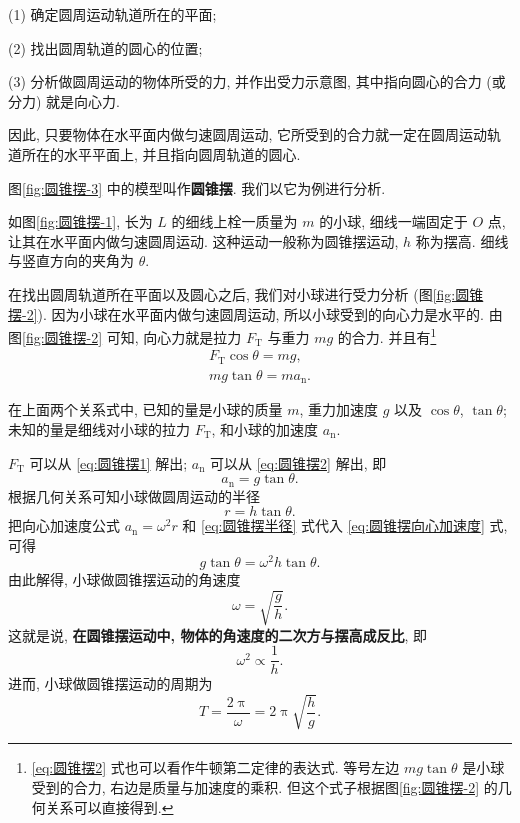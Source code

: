 \documentclass[UTF8,openany,fontset=fandol]{ctexbook}
\theoremstyle{chinesetextbook}
\begin{document}
(1) 确定圆周运动轨道所在的平面;

(2) 找出圆周轨道的圆心的位置;

(3) 分析做圆周运动的物体所受的力, 并作出受力示意图, 其中指向圆心的合力 (或分力) 就是向心力.

因此, 只要物体在水平面内做匀速圆周运动, 它所受到的合力就一定在圆周运动轨道所在的水平平面上, 并且指向圆周轨道的圆心.

图\ref{fig:圆锥摆-3} 中的模型叫作\textbf{圆锥摆}. 我们以它为例进行分析.

如图\ref{fig:圆锥摆-1}, 长为 $L$ 的细线上栓一质量为 $m$ 的小球, 细线一端固定于 $O$ 点, 让其在水平面内做匀速圆周运动. 这种运动一般称为圆锥摆运动, $h$ 称为摆高. 细线与竖直方向的夹角为 $\theta$.

在找出圆周轨道所在平面以及圆心之后, 我们对小球进行受力分析 (图\ref{fig:圆锥摆-2}). 因为小球在水平面内做匀速圆周运动, 所以小球受到的向心力是水平的. 由图\ref{fig:圆锥摆-2} 可知, 向心力就是拉力 $F_\text{T}$ 与重力 $mg$ 的合力. 并且有\footnote{\eqref{eq:圆锥摆2} 式也可以看作牛顿第二定律的表达式. 等号左边 $mg\tan\theta$ 是小球受到的合力, 右边是质量与加速度的乘积. 但这个式子根据图\ref{fig:圆锥摆-2} 的几何关系可以直接得到.}
\begin{align}
F_\mathrm{T}\cos\theta=mg,\label{eq:圆锥摆1}\\
mg\tan\theta=ma_\mathrm{n}.\label{eq:圆锥摆2}
\end{align}

在上面两个关系式中, 已知的量是小球的质量 $m$, 重力加速度 $g$ 以及 $\cos\theta$, $\tan\theta$; 未知的量是细线对小球的拉力 $F_\text{T}$, 和小球的加速度 $a_\text{n}$.

$F_\text{T}$ 可以从 \eqref{eq:圆锥摆1} 解出; $a_\text{n}$ 可以从 \eqref{eq:圆锥摆2} 解出, 即
\begin{equation}\label{eq:圆锥摆向心加速度}
a_\mathrm{n}=g\tan\theta.
\end{equation}
根据几何关系可知小球做圆周运动的半径
\begin{equation}\label{eq:圆锥摆半径}
r=h\tan\theta.
\end{equation}
把向心加速度公式 $a_\mathrm{n}=\omega^2 r$ 和 \eqref{eq:圆锥摆半径} 式代入 \eqref{eq:圆锥摆向心加速度} 式, 可得
\[
g\tan\theta=\omega^2 h\tan\theta.
\]
由此解得, 小球做圆锥摆运动的角速度
\begin{equation}\label{eq:圆锥摆角速度}
\omega=\sqrt{\frac{g}{h}}.
\end{equation}
这就是说, \textbf{在圆锥摆运动中, 物体的角速度的二次方与摆高成反比}, 即
\[
\omega^2\propto\frac{1}{h}.
\]
进而, 小球做圆锥摆运动的周期为
\[
T=\frac{2\uppi}{\omega}=2\uppi\sqrt{\frac{h}{g}}.
\]
\end{document}
